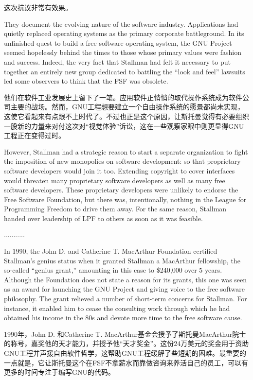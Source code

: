 \ifdefined\chs
这次抗议非常有效果。 
\fi

\ifdefined\eng
They document the evolving nature of the software industry. Applications had quietly replaced operating systems as the primary corporate battleground. In its unfinished quest to build a free software operating system, the GNU Project seemed hopelessly behind the times to those whose primary values were fashion and success. Indeed, the very fact that Stallman had felt it necessary to put together an entirely new group dedicated to battling the ``look and feel'' lawsuits led some observers to think that the FSF was obsolete.
\fi

\ifdefined\chs
他们在软件工业发展史上留下了一笔。应用软件正悄悄的取代操作系统成为软件公司主要的战场。然而，GNU工程想要建立一个自由操作系统的愿景都尚未实现，这使它看起来有点跟不上时代了。不过也正是这个原因，让斯托曼觉得有必要组织一股新的力量来对付这次对“视觉体验”诉讼，这在一些观察家眼中则更显得GNU工程正在变得过时。
\fi

\ifdefined\eng
However, Stallman had a strategic reason to start a separate organization to fight the imposition of new monopolies on software development: so that proprietary software developers would join it too.  Extending copyright to cover interfaces would threaten many proprietary software developers as well as many free software developers.  These proprietary developers were unlikely to endorse the Free Software Foundation, but there was, intentionally, nothing in the League for Programming Freedom to drive them away.  For the same reason, Stallman handed over leadership of LPF to others as soon as it was feasible.
\fi

\ifdefined\chs
...........
\fi

\ifdefined\eng
In 1990, the John D. and Catherine T. MacArthur Foundation certified Stallman's genius status when it granted Stallman a MacArthur fellowship, the so-called ``genius grant,'' amounting in this case to \$240,000 over 5 years. Although the Foundation does not state a reason for its grants, this one was seen as an award for launching the GNU Project and giving voice to the free software philosophy.  The grant relieved a number of short-term concerns for Stallman.  For instance, it enabled him to cease the consulting work through which he had obtained his income in the 80s and devote more time to the free software cause.
\fi

\ifdefined\chs
1990年，John D. 和Catherine T. MacArthur基金会授予了斯托曼MacArthur院士的称号，嘉奖他的天才能力，并授予他“天才奖金”。这份24万美元的奖金用于资助GNU工程并声援自由软件哲学，这帮助GNU工程缓解了些短期的困难。最重要的一点就是，它让斯托曼这个在FSF不拿薪水而靠做咨询来养活自己的员工，可以有更多的时间专注于编写GNU的代码。
\fi

